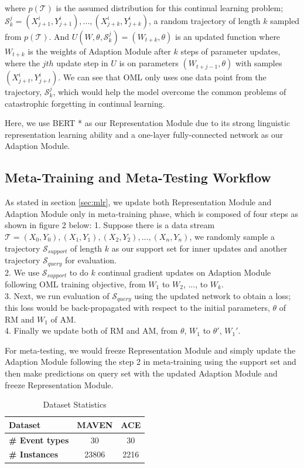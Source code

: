where $p(\mathcal{T})$ is the assumed distribution for this continual learning problem; $\mathcal{S}_k ^ j = (X_{j+1}^i, Y_{j+1}^i), ..., (X_{j+k}^i, Y_{j+k}^i)$, a random trajectory of length $k$ sampled from $p(\mathcal{T})$. And $U(W, \theta, \mathcal{S}_k ^ j) = (W_{t+k}, \theta)$ is an updated function where $W_{t+k}$ is the weights of Adaption Module after $k$ steps of parameter updates, where the $jth$ update step in $U$ is on parameters $(W_{t+j-1}, \theta)$ with samples $(X_{j+t}^i, Y_{j+t}^i)$. We can see that OML only uses one data point from the trajectory, $\mathcal{S}_k ^ j$, which would help the model overcome the common problems of catastrophic forgetting in continual learning. 

Here, we use BERT * as our Representation Module due to its strong linguistic representation learning ability and a one-layer fully-connected network as our Adaption Module. 

\subsection{Meta-Training and Meta-Testing Workflow}
As stated in section \ref{sec:mlr}, we update both Representation Module and Adaption Module only in meta-training phase, which is composed of four steps as shown in figure 2 below: 
1. Suppose there is a data stream $\mathcal{T} = (X_0, Y_0), (X_1, Y_1), (X_2, Y_2), ..., (X_n, Y_n)$, we randomly sample a trajectory $\mathcal{S}_{support}$ of length $k$ as our support set for inner updates and another trajectory $\mathcal{S}_{query}$ for evaluation. \\
2. We use $\mathcal{S}_{support}$ to do $k$ continual gradient updates on Adaption Module following OML training objective, from  $W_1$ to $W_2$, ..., to $W_k$. \\
3. Next, we run evaluation of $\mathcal{S}_{query}$ using the updated network to obtain a loss; this loss would be back-propagated with respect to the initial parameters, $\theta$ of RM and $W_1$ of AM. \\
4. Finally we update both of RM and AM, from  $\theta$, $W_1$ to $\theta'$, $W_1'$.

For meta-testing, we would freeze Representation Module and simply update the Adaption Module following the step 2 in meta-training using the support set and then make predictions on query set with the updated Adaption Module and freeze Representation Module.
\begin{table}[h]
\centering
\begin{tabular}{lcc}
\hline
\textbf{Dataset} & \textbf{MAVEN} & \textbf{ACE} \\
\hline
\textbf{\# Event types}& {30} & {30} \\
\textbf{\# Instances} & {23806}& {2216} \\
\hline
\end{tabular}
\caption{Dataset Statistics}
\label{tab:stats}
\end{table}
